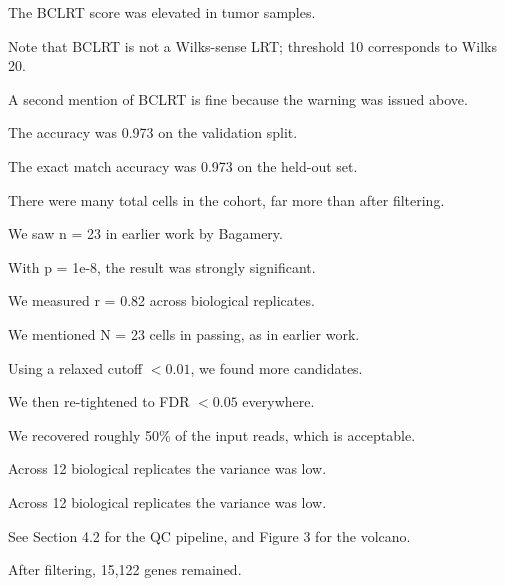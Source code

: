 \documentclass{article}
\newcommand{\SciVal}[2]{#1}
\newcommand{\NGenesAfterFiltering}{15,122}
\newcommand{\FDRThreshold}{0.05}
\newcommand{\NReplicates}{12}
\newcommand{\ExactAccuracy}{0.973}
\begin{document}

The BCLRT score was elevated in tumor samples.

Note that BCLRT is not a Wilks-sense LRT; threshold 10 corresponds to Wilks 20.

A second mention of BCLRT is fine because the warning was issued above.


The accuracy was \SciVal{\ExactAccuracy}{0.973} on the validation split.

The exact match accuracy was \SciVal{\ExactAccuracy}{0.973} on the held-out set.

There were many total cells in the cohort, far more than after filtering.


We saw n = 23 in earlier work by Bagamery.

With p = 1e-8, the result was strongly significant.

We measured r = 0.82 across biological replicates.

We mentioned N = 23 cells in passing, as in earlier work.


Using a relaxed cutoff $< 0.01$, we found more candidates.

We then re-tightened to FDR $< \SciVal{\FDRThreshold}{0.05}$ everywhere.



We recovered roughly 50\% of the input reads, which is acceptable.

Across \SciVal{\NReplicates}{12} biological replicates the variance was low.

Across \SciVal{\NReplicates}{11} biological replicates the variance was low.

See Section 4.2 for the QC pipeline, and Figure 3 for the volcano.

After filtering, \SciVal{\NGenesAfterFiltering}{15,122} genes remained.
\end{document}

